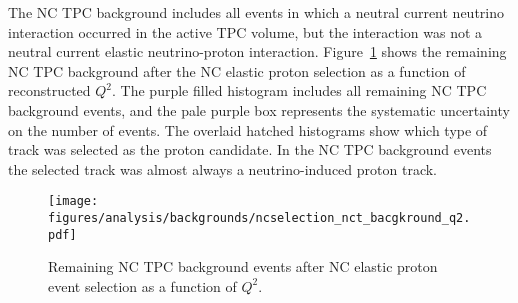     The NC TPC background includes all events in which a neutral current
    neutrino interaction occurred in the active TPC volume, but the interaction
    was not a neutral current elastic neutrino-proton interaction.
    Figure~\ref{fig:selectednctpc} shows the remaining NC TPC background after
    the NC elastic proton selection as a function of reconstructed $Q^2$. The
    purple filled histogram includes all remaining NC TPC background events,
    and the pale purple box represents the systematic uncertainty on the number
    of events. The overlaid hatched histograms show which type of track was
    selected as the proton candidate.  In the NC TPC background events the
    selected track was almost always a neutrino-induced proton track.
    \begin{figure}[ht]
      \centering
      \texttt{[image: figures/analysis/backgrounds/ncselection\_nct\_bacgkround\_q2.pdf]}
      \caption{Remaining NC TPC background events after NC elastic
      proton event selection as a function of $Q^2$.}
      \label{fig:selectednctpc}
    \end{figure}
    
